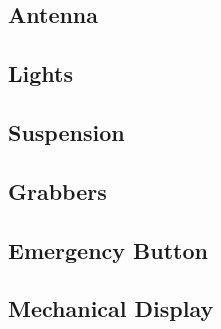 \newcommand{\PartListDrawing}[2]{
\begin{figure}[!ht]
    \centering
    \texttt{[image: \#1]}
    \caption{#2}
\end{figure}
}

\subsection{Antenna}


\subsection{Lights}


\subsection{Suspension}


\subsection{Grabbers}


\subsection{Emergency Button}


\subsection{Mechanical Display}

